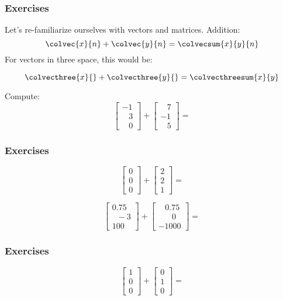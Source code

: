 
\begin{enumerate}
\begin{frame}

  \frametitle{Exercises}
\item Let's re-familiarize ourselves with vectors and matrices.  
Addition:
\[\colvec{x}{n}+\colvec{y}{n}=\colvecsum{x}{y}{n}\]
For vectors in three space, this would be:

\[\colvecthree{x}{}+\colvecthree{y}{}=\colvecthreesum{x}{y}\] 

Compute:
\[
\begin{bmatrix}
-1\\
\;\;\;3\\
\;\;\;0 \end{bmatrix}
+
\begin{bmatrix}
\;\;\;7\\
-1\\
\;\;\;5 \end{bmatrix}=
\]

\end{frame}


\begin{frame}

  \frametitle{Exercises}
\[
\begin{bmatrix}
0\\
0\\
0 \end{bmatrix}
+
\begin{bmatrix}
2\\
2\\
1 \end{bmatrix}=
\]

\[
\begin{bmatrix}
0.75\\
\;\;-3\\
100 \end{bmatrix}
+
\begin{bmatrix}
\;\;\;0.75\\
\;\;\;\;\;\;0\\
-1000 \end{bmatrix}=
\]

\end{frame}


\begin{frame}

  \frametitle{Exercises}
\[
\begin{bmatrix}
1\\
0\\
0 \end{bmatrix}
+
\begin{bmatrix}
0\\
1\\
0 \end{bmatrix}=
\]


\end{frame}
\end{enumerate}
